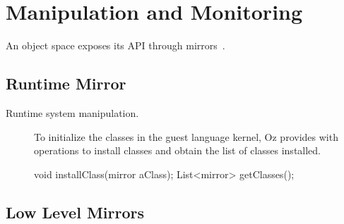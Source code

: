 %
%

\section{Manipulation and Monitoring} \label{sec:membrane}

An object space exposes its API through mirrors~\cite{Brac04b}. 

\subsection{Runtime Mirror}

\begin{description}
\item[Runtime system manipulation.] To initialize the classes in the guest language kernel, Oz provides with operations to install classes and obtain the list of classes installed.
\begin{code}
void installClass(mirror aClass);
List<mirror> getClasses();
\end{code}

\end{description}

\subsection{Low Level Mirrors}

